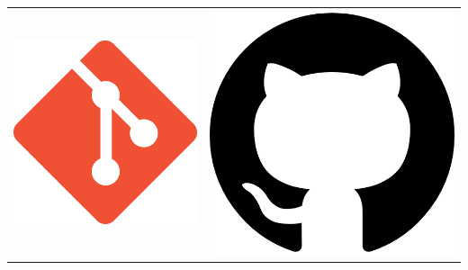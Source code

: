 \documentclass{article}
\begin{document}
\hfill \break
\newline
\begin{center}
\begin{tabular}{ c c  }
\includegraphics[scale=0.3]{git.png} & \href{https://github.com/Juan-Salazar-Saenz/R/tree/master/Tarea_1}{\includegraphics[scale=0.3]{github.png}} 
\end{tabular}
\end{center}
\end{document}
